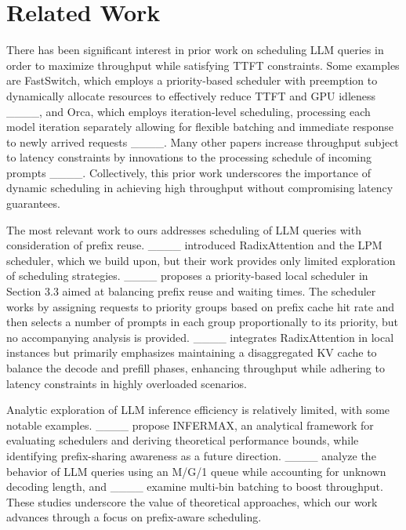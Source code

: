 \section{Related Work}
There has been significant interest in prior work on scheduling LLM queries in order to maximize throughput while satisfying TTFT constraints. Some examples are FastSwitch, which employs a priority-based scheduler with preemption to dynamically allocate resources to effectively reduce TTFT and GPU idleness ____, and Orca, which employs iteration-level scheduling, processing each model iteration separately allowing for flexible batching and immediate response to newly arrived requests ____. Many other papers increase throughput subject to latency constraints by innovations to the processing schedule of incoming prompts ____. Collectively, this prior work underscores the importance of dynamic scheduling in achieving high throughput without compromising latency guarantees.

The most relevant work to ours addresses scheduling of LLM queries with consideration of prefix reuse. ____ introduced RadixAttention and the LPM scheduler, which we build upon, but their work provides only limited exploration of scheduling strategies. ____ proposes a priority-based local scheduler in Section 3.3 aimed at balancing prefix reuse and waiting times. The scheduler works by assigning requests to priority groups based on prefix cache hit rate and then selects a number of prompts in each group proportionally to its priority, but no accompanying analysis is provided. ____ integrates RadixAttention in local instances but primarily emphasizes maintaining a disaggregated KV cache to balance the decode and prefill phases, enhancing throughput while adhering to latency constraints in highly overloaded scenarios.

Analytic exploration of LLM inference efficiency is relatively limited, with some notable examples. ____ propose INFERMAX, an analytical framework for evaluating schedulers and deriving theoretical performance bounds, while identifying prefix-sharing awareness as a future direction. ____ analyze the behavior of LLM queries using an M/G/1 queue while accounting for unknown decoding length, and ____ examine multi-bin batching to boost throughput. These studies underscore the value of theoretical approaches, which our work advances through a focus on prefix-aware scheduling.